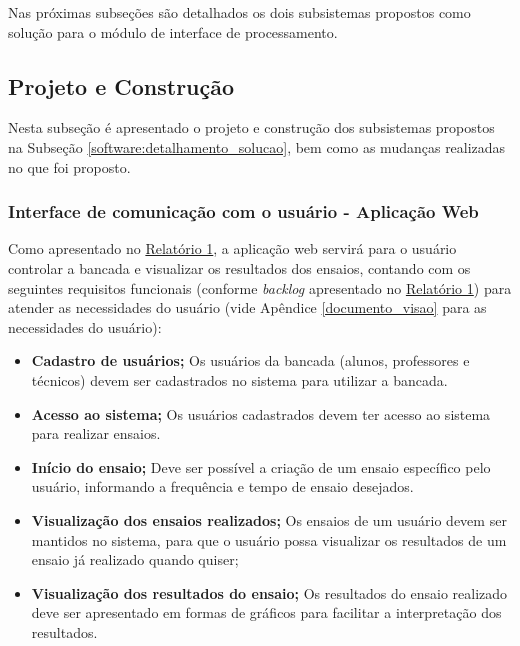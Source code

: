 Nas próximas subseções são detalhados os dois subsistemas propostos como solução para o módulo de interface de processamento.


\subsection{Projeto e Construção}

  Nesta subseção é apresentado o projeto e construção dos subsistemas propostos na Subseção \ref{software:detalhamento_solucao},
  bem como as mudanças realizadas no que foi proposto.

\subsubsection{\textbf{Interface de comunicação com o usuário - Aplicação Web}}
    
    Como  apresentado no \href{https://drive.google.com/file/d/0B5InkGKx6O-MR1B3eVYzZFpjQ3c/view?usp=sharing}{Relatório 1},
    a aplicação web servirá para o usuário controlar a bancada e visualizar os resultados dos ensaios, contando com os seguintes requisitos
    funcionais (conforme \textit{backlog} apresentado no \href{https://drive.google.com/file/d/0B5InkGKx6O-MR1B3eVYzZFpjQ3c/view?usp=sharing}{Relatório 1})
    para atender as necessidades do usuário (vide Apêndice \ref{documento_visao} para as necessidades do usuário):
    
    \begin{itemize}
      \item \textbf{Cadastro de usuários;}
	 \subitem Os usuários da bancada (alunos, professores e técnicos) devem ser cadastrados no sistema para utilizar a bancada.
      \item \textbf{Acesso ao sistema;}
	 \subitem Os usuários cadastrados devem ter acesso ao sistema para realizar ensaios.
      \item \textbf{Início do ensaio;}
	 \subitem Deve ser possível a criação de um ensaio específico pelo usuário, informando a frequência e tempo de ensaio desejados.
      \item \textbf{Visualização dos ensaios realizados;}
	 \subitem Os ensaios de um usuário devem ser mantidos no sistema, para que o usuário possa visualizar os resultados de um ensaio
		  já realizado quando quiser;
      \item \textbf{Visualização dos resultados do ensaio;}
	 \subitem Os resultados do ensaio realizado deve ser apresentado em formas de gráficos para facilitar a interpretação dos resultados.
    \end{itemize}
     
